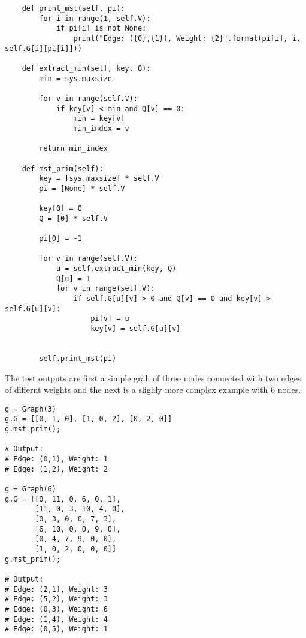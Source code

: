 \documentclass{article}
\begin{document}
\begin{enumerate}
\begin{lstlisting}
    def print_mst(self, pi): 
        for i in range(1, self.V):
            if pi[i] is not None:
                print("Edge: ({0},{1}), Weight: {2}".format(pi[i], i, self.G[i][pi[i]]))

    def extract_min(self, key, Q): 
        min = sys.maxsize 

        for v in range(self.V): 
            if key[v] < min and Q[v] == 0: 
                min = key[v] 
                min_index = v 

        return min_index 

    def mst_prim(self):
        key = [sys.maxsize] * self.V 
        pi = [None] * self.V 

        key[0] = 0 
        Q = [0] * self.V 

        pi[0] = -1

        for v in range(self.V): 
            u = self.extract_min(key, Q) 
            Q[u] = 1
            for v in range(self.V): 
                if self.G[u][v] > 0 and Q[v] == 0 and key[v] > self.G[u][v]: 
                    pi[v] = u
                    key[v] = self.G[u][v] 


        self.print_mst(pi)
    \end{lstlisting}
    
The test outputs are first a simple grah of three nodes connected with two edges of differnt weights and the next is a slighly more complex example with 6 nodes.

\begin{lstlisting}
g = Graph(3) 
g.G = [[0, 1, 0], [1, 0, 2], [0, 2, 0]] 
g.mst_prim(); 

# Output:
# Edge: (0,1), Weight: 1
# Edge: (1,2), Weight: 2

g = Graph(6) 
g.G = [[0, 11, 0, 6, 0, 1], 
       [11, 0, 3, 10, 4, 0], 
       [0, 3, 0, 0, 7, 3], 
       [6, 10, 0, 0, 9, 0], 
       [0, 4, 7, 9, 0, 0],
       [1, 0, 2, 0, 0, 0]]
g.mst_prim(); 

# Output:
# Edge: (2,1), Weight: 3
# Edge: (5,2), Weight: 3
# Edge: (0,3), Weight: 6
# Edge: (1,4), Weight: 4
# Edge: (0,5), Weight: 1
\end{lstlisting}



  \end{enumerate} %
\end{document}
